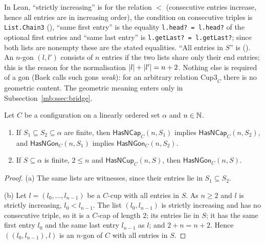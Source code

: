 \begin{remark}\label{mb:rem:config}
In Lean, ``strictly increasing'' is  for the relation $<$ (consecutive entries increase, hence all
entries are in increasing order), the condition on consecutive triples is \texttt{List.Chain3\textquotesingle}
(), ``same first entry'' is the equality
\texttt{l.head? = l\textquotesingle.head?} of the optional first entries and ``same last entry'' is \texttt{l.getLast? = l\textquotesingle.getLast?};
since both lists are nonempty these are the stated equalities. ``All entries in $S$'' is
 (). An $n$-gon $(l,l')$ consists of $n$ entries if
the two lists share only their end entries; this is the reason for the normalisation $\lvert l\rvert+\lvert l'\rvert=n+2$. Nothing
else is required of a gon (Baek calls such gons \emph{weak}): for an arbitrary relation $\mathrm{Cup3}_C$ there is no
geometric content. The geometric meaning enters only in Subsection~\ref{mb:ssec:bridge}.
\end{remark}

\begin{lemma}\label{mb:lem:config-mono}
Let $C$ be a configuration on a linearly ordered set $\alpha$ and $n\in\mathbb N$.
\begin{enumerate}[label=(\alph*)]
\item If $S_1\subseteq S_2\subseteq\alpha$ are finite, then $\mathsf{HasNCap}_C(n,S_1)$ implies
  $\mathsf{HasNCap}_C(n,S_2)$, and $\mathsf{HasNGon}_C(n,S_1)$ implies $\mathsf{HasNGon}_C(n,S_2)$.
\item If $S\subseteq\alpha$ is finite, $2\le n$ and $\mathsf{HasNCup}_C(n,S)$, then $\mathsf{HasNGon}_C(n,S)$.
\end{enumerate}
\end{lemma}

\begin{proof}
(a) The same lists are witnesses, since their entries lie in $S_1\subseteq S_2$.

(b) Let $l=(l_0,\dots,l_{n-1})$ be a $C$-cup with all entries in $S$. As $n\ge2$ and $l$ is strictly increasing,
$l_0<l_{n-1}$. The list $(l_0,l_{n-1})$ is strictly increasing and has no consecutive triple, so it is a $C$-cap of
length $2$; its entries lie in $S$; it has the same first entry $l_0$ and the same last entry $l_{n-1}$ as $l$; and
$2+n=n+2$. Hence $((l_0,l_{n-1}),l)$ is an $n$-gon of $C$ with all entries in $S$.
\end{proof}

